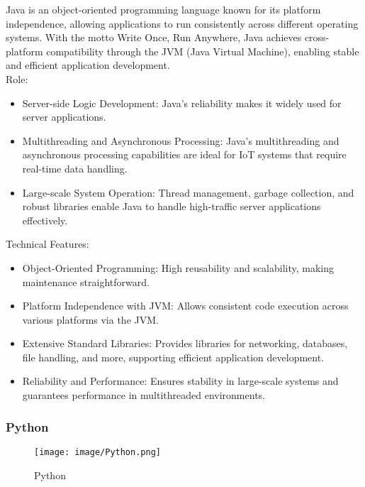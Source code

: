 \documentclass[conference]{IEEEtran}
\begin{document}
\noindent Java is an object-oriented programming language known for its platform independence, allowing applications to run consistently across different operating systems. With the motto Write Once, Run Anywhere, Java achieves cross-platform compatibility through the JVM (Java Virtual Machine), enabling stable and efficient application development. \\

Role:
\begin{itemize}
    \item Server-side Logic Development: Java’s reliability makes it widely used for server applications.\\ 
    \item Multithreading and Asynchronous Processing: Java's multithreading and asynchronous processing capabilities are ideal for IoT systems that require real-time data handling.\\
    \item Large-scale System Operation: Thread management, garbage collection, and robust libraries enable Java to handle high-traffic server applications effectively.\\
\end{itemize}

Technical Features:
\begin{itemize}
    \item Object-Oriented Programming: High reusability and scalability, making maintenance straightforward.\\
    \item Platform Independence with JVM: Allows consistent code execution across various platforms via the JVM.\\
    \item Extensive Standard Libraries: Provides libraries for networking, databases, file handling, and more, supporting efficient application development.\\
    \item Reliability and Performance: Ensures stability in large-scale systems and guarantees performance in multithreaded environments.\\
\end{itemize}

\clearpage

\subsubsection{Python}

\begin{figure}[h!]
    \centering
    \texttt{[image: image/Python.png]}
    \caption{Python}
    \label{fig:enter-label}
\end{figure}
\end{document}
